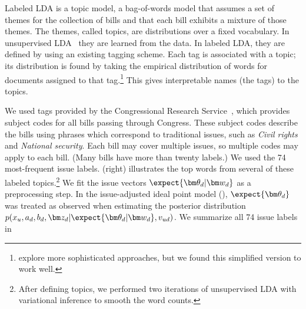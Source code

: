 Labeled LDA is a topic model, a bag-of-words model that assumes a set
of themes for the collection of bills and that each bill exhibits a
mixture of those themes.  The themes, called topics, are distributions
over a fixed vocabulary.  In unsupervised LDA~\citep{blei:2003} they
are learned from the data.  In labeled LDA, they are defined by using
an existing tagging scheme.  Each tag is associated with a topic; its
distribution is found by taking the empirical distribution of words
for documents assigned to that tag.\footnote{\cite{ramage:2009} explore
  more sophisticated approaches, but we found this
  simplified version to work well.}  This gives
interpretable names (the tags) to the topics.

We used tags provided by the Congressional Research
Service~\citep{crs:2011}, which provides subject codes for all bills
passing through Congress.  These subject codes describe the bills
using phrases which correspond to traditional issues, such as
\emph{Civil rights} and \emph{National security}. Each bill may cover
multiple issues, so multiple codes may apply to each bill. (Many bills
have more than twenty labels.)  We used the 74 most-frequent issue
labels.  (right) illustrates the top
words from several of these labeled topics.\footnote{After defining
  topics, we performed two iterations of unsupervised LDA with
  variational inference to smooth the word counts.} We fit the issue
vectors $\expect{\bm \theta_d | \bm w_d}$ as a preprocessing step.  In
the issue-adjusted ideal point model
(), $\expect{\bm \theta_d}$
was treated as observed when estimating the posterior distribution
$p(x_u, a_d, b_d, \bm z_d | \expect{\bm \theta_d | \bm w_d},
v_{ud})$. We summarize all 74 issue labels in 



